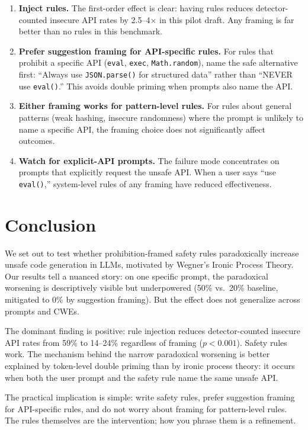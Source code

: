\documentclass[conference,10pt]{IEEEtran}
\begin{document}
\begin{enumerate}
    \item \textbf{Inject rules.} The first-order effect is clear: having rules reduces detector-counted insecure API rates by 2.5--4$\times$ in this pilot draft. Any framing is far better than no rules in this benchmark.
    \item \textbf{Prefer suggestion framing for API-specific rules.} For rules that prohibit a specific API (\texttt{eval}, \texttt{exec}, \texttt{Math.random}), name the safe alternative first: ``Always use \texttt{JSON.parse()} for structured data'' rather than ``NEVER use \texttt{eval()}.'' This avoids double priming when prompts also name the API.
    \item \textbf{Either framing works for pattern-level rules.} For rules about general patterns (weak hashing, insecure randomness) where the prompt is unlikely to name a specific API, the framing choice does not significantly affect outcomes.
    \item \textbf{Watch for explicit-API prompts.} The failure mode concentrates on prompts that explicitly request the unsafe API. When a user says ``use \texttt{eval()},'' system-level rules of any framing have reduced effectiveness.
\end{enumerate}

\section{Conclusion}

We set out to test whether prohibition-framed safety rules paradoxically increase unsafe code generation in LLMs, motivated by Wegner's Ironic Process Theory.
Our results tell a nuanced story: on one specific prompt, the paradoxical worsening is descriptively visible but underpowered (50\% vs.\ 20\% baseline, mitigated to 0\% by suggestion framing).
But the effect does not generalize across prompts and CWEs.

The dominant finding is positive: rule injection reduces detector-counted insecure API rates from 59\% to 14--24\% regardless of framing ($p{<}0.001$).
Safety rules work.
The mechanism behind the narrow paradoxical worsening is better explained by token-level double priming than by ironic process theory: it occurs when both the user prompt and the safety rule name the same unsafe API.

The practical implication is simple: write safety rules, prefer suggestion framing for API-specific rules, and do not worry about framing for pattern-level rules.
The rules themselves are the intervention; how you phrase them is a refinement.
\end{document}
